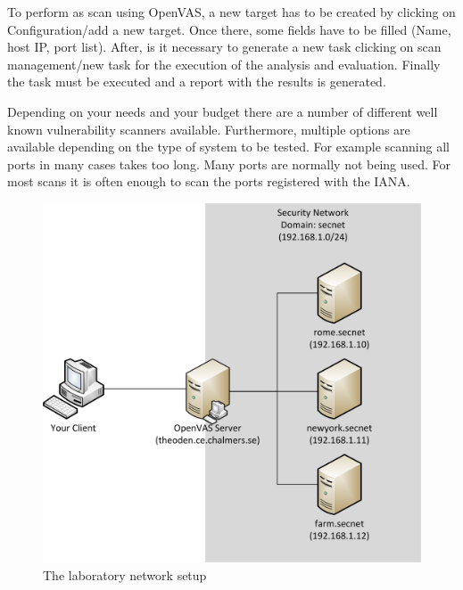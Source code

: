 To perform as scan using OpenVAS, a new target has to be created by clicking on Configuration/add a new 	target. Once there, some fields have to be filled (Name, host IP, port list). After, is it necessary to generate a new task clicking on scan management/new task for the execution of the analysis and evaluation. Finally the task must be executed and a report with the results is generated.


Depending on your needs and your budget there are a number of different well known vulnerability scanners available. Furthermore, multiple options are available depending on the type of system to be tested. For example scanning all ports in many cases takes too long. Many ports are normally not being used. For most scans it is often enough to scan the ports registered with the IANA.

\begin{figure}[htb]
  \centering
  \includegraphics[scale=.4]{figures/setup.png}
  \caption{The laboratory network setup} \label{fig:setup}
\end{figure}




